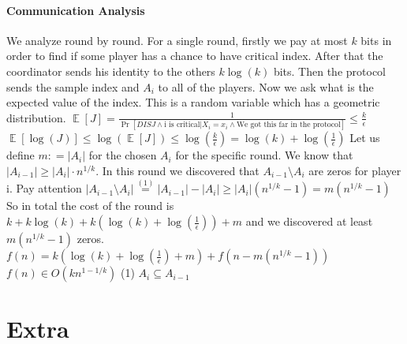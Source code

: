 \documentclass{article}
\begin{document}
\paragraph{Communication Analysis}
We analyze round by round. For a single round, firstly we pay at most $k$ bits in order to find if some player has a chance to have critical index. After that the coordinator sends his identity to the others $k\log(k)$ bits. Then the protocol sends the sample index and $A_{i}$ to all of the players. Now we ask what is the expected value of the index. \newline
This is a random variable which has a geometric distribution. \newline
$ \mathop{\mathbb{E}} [J] = \frac{1}{\Pr[DISJ \land \text{i is critical} | X_i = x_i \land \text{We got this far in the protocol}]} \leq \frac{k}{\epsilon}$ \newline
$\mathop{\mathbb{E}} [\log(J)] \leq \log(\mathop{\mathbb{E}} [J]) \leq \log(\frac{k}{\epsilon}) = \log(k) + \log(\frac{1}{\epsilon})$ \newline
Let us define $m : = |A_i|$ for the chosen $A_i$ for the specific round.
We know that $|A_{i-1}| \geq |A_i| \cdot n^{1/k}$. In this round we discovered that $A_{i-1} \setminus A_i$ are zeros for player i. Pay attention $|A_{i-1} \setminus A_i| \overset{(1)}{=} |A_{i-1}| - |A_i| \geq |A_i|(n^{1/k} - 1) = m(n^{1/k} - 1)$ \newline
So in total the cost of the round is $k + k\log(k) + k(\log(k) + \log(\frac{1}{\epsilon})) + m$ and we discovered at least $m(n^{1/k} - 1)$ zeros. \newline
$f(n) = k(\log(k) + \log(\frac{1}{\epsilon}) + m) + f(n - m(n^{1/k} - 1))$ \newline 
$f(n) \in O(kn^{1-1/k})$ \newline
(1) $A_i \subseteq A_{i-1}$
\section{Extra}
\end{document}
